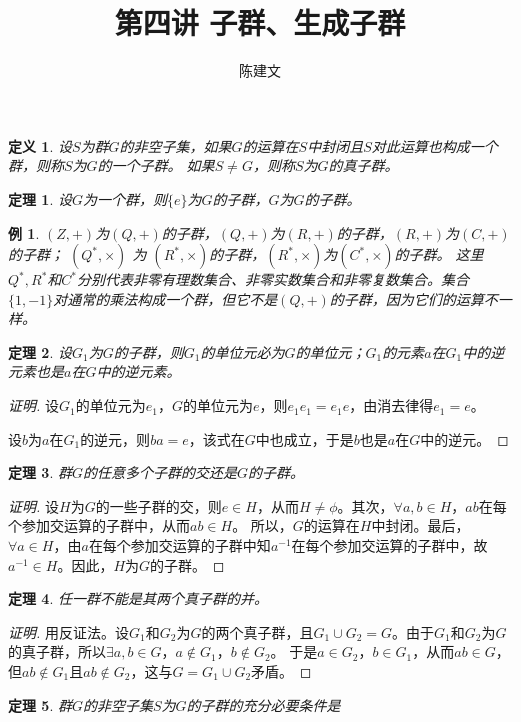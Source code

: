 \documentclass{article}
\newtheorem{Def}{定义}
\newtheorem{Thm}{定理}
\newtheorem*{Example}{例}
\begin{document}
\begin{CJK*}{UTF8}{gbsn}
  \title{第四讲 子群、生成子群}
  \author{陈建文}
  \maketitle
 \begin{Def}
  设$S$为群$G$的非空子集，如果$G$的运算在$S$中封闭且$S$对此运算也构成一个群，则称$S$为$G$的一个子群。
  如果$S\neq G$，则称$S$为$G$的真子群。
 \end{Def} 
\begin{Thm}
设$G$为一个群，则$\{e\}$为$G$的子群，$G$为$G$的子群。
\end{Thm}
\begin{Example}
  $(Z,+)$为$(Q,+)$的子群，$(Q,+)$为$(R,+)$的子群，$(R,+)$为$(C,+)$的子群；
  $(Q^*,\times)$ 为 $(R^*,\times)$的子群，$(R^*,\times)$为$(C^*,\times)$的子群。
  这里$Q^*,R^*$和$C^*$分别代表非零有理数集合、非零实数集合和非零复数集合。集合$\{1,-1\}$对通常的乘法构成一个群，但它不是$(Q,+)$的子群，因为它们的运算不一样。
\end{Example}

 \begin{Thm}
  设$G_1$为$G$的子群，则$G_1$的单位元必为$G$的单位元；$G_1$的元素$a$在$G_1$中的逆元素也是$a$在$G$中的逆元素。
 \end{Thm}
\begin{proof}[证明]
  设$G_1$的单位元为$e_1$，$G$的单位元为$e$，则$e_1e_1=e_1e$，由消去律得$e_1=e$。

  设$b$为$a$在$G_1$的逆元，则$ba=e$，该式在$G$中也成立，于是$b$也是$a$在$G$中的逆元。
\end{proof}
 \begin{Thm}
  群$G$的任意多个子群的交还是$G$的子群。
 \end{Thm}
\begin{proof}[证明]
  设$H$为$G$的一些子群的交，则$e\in H$，从而$H\neq \phi$。其次，$\forall a,b\in H$，$ab$在每个参加交运算的子群中，从而$ab\in H$。
  所以，$G$的运算在$H$中封闭。最后，$\forall a\in H$，由$a$在每个参加交运算的子群中知$a^{-1}$在每个参加交运算的子群中，故$a^{-1}\in H$。因此，$H$为$G$的子群。
\end{proof}
 \begin{Thm}
  任一群不能是其两个真子群的并。
 \end{Thm}
\begin{proof}[证明]
  用反证法。设$G_1$和$G_2$为$G$的两个真子群，且$G_1\cup G_2=G$。由于$G_1$和$G_2$为$G$的真子群，所以$\exists a,b\in G$，$a\notin G_1$，$b\notin G_2$。
  于是$a\in G_2$，$b\in G_1$，从而$ab\in G$，但$ab\notin G_1$且$ab\notin G_2$，这与$G=G_1\cup G_2$矛盾。
\end{proof}
 \begin{Thm}
  群$G$的非空子集$S$为$G$的子群的充分必要条件是


\end{Thm}
\end{CJK*}
\end{document}
